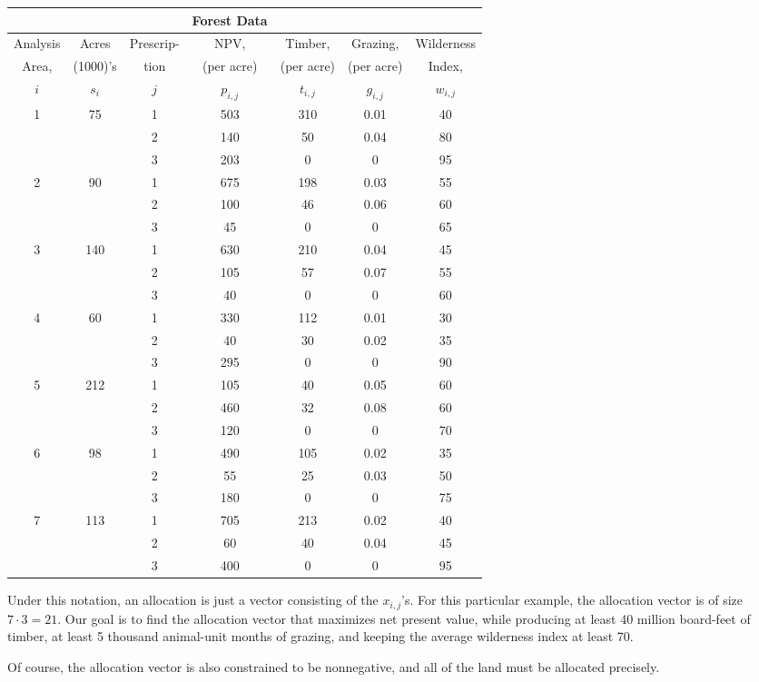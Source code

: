 \begin{table}[h]
\centering
    \begin{tabular}{c c c c c c c}
&&&Forest Data&&& \\
\hline
Analysis & Acres &Prescrip-&NPV,&Timber,&Grazing,&Wilderness \\
Area,&(1000)'s &tion&(per acre) &(per acre)&(per acre)& Index,\\
$i$ &$s_i$&$j$& $p_{i,j}$ & $t_{i,j}$&$g_{i,j}$&$w_{i,j}$ \\\hline
1&	75	&1	&503	&310	&0.01&	40\\
&&		2&	140&	50&	0.04	&80\\
&&		3&	203&	0&	0&	95\\ \hline
2&	90&	1	&675&	198&	0.03&	55\\
&&		2&	100&	46&	0.06&	60\\
&&		3&	45&	0&	0&	65\\ \hline
3&	140&	1	&630&	210	&0.04&	45\\
&&		2&	105&	57&	0.07&	55\\
&&		3&	40	&0&	0&	60\\ \hline
4	&60&	1&	330&	112&	0.01&	30\\
&&		2	&40&	30&	0.02&	35\\
&&		3&	295&	0&	0	&90\\ \hline
5	&212&	1	&105	&40	&0.05&	60\\
&&		2	&460&	32	&0.08&	60\\
&& 3	&120&0&	0	&70\\ \hline
6	&98	&1	&490	&105	&0.02	&35\\
&&		2&	55	&25	&0.03	&50\\
&&		3	&180	&0	&0	&75\\ \hline
7&	113&	1	&705	&213&	0.02	&40\\
&&		2&	60	&40	&0.04&	45\\
&&		3	&400	&0	&0	&95\\
\hline
    \end{tabular}
\label{tab:forest}
\end{table}

Under this notation, an allocation is just a vector consisting of the $x_{i,j}$'s. For this particular
example, the allocation vector is of size $7\cdot 3 = 21$. 
Our goal is to find the allocation vector that maximizes net present value, while producing at least 40 million
board-feet of timber, at least 5 thousand animal-unit months of grazing, and keeping the average wilderness index at least 70.

Of course, the allocation vector is also constrained to be nonnegative, and all of the land must be allocated precisely. 

